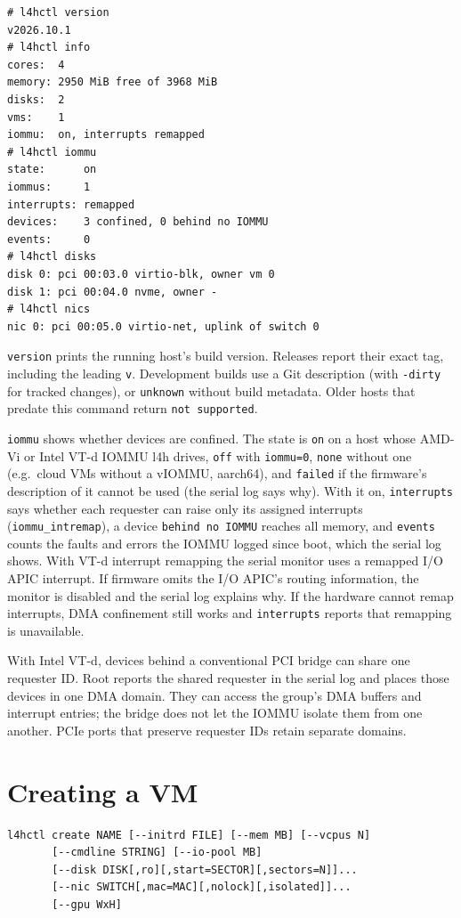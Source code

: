 \documentclass[11pt,a4paper]{report}
\newcommand{\cmd}[1]{\texttt{#1}}
\begin{document}
\begin{lstlisting}
# l4hctl version
v2026.10.1
# l4hctl info
cores:  4
memory: 2950 MiB free of 3968 MiB
disks:  2
vms:    1
iommu:  on, interrupts remapped
# l4hctl iommu
state:      on
iommus:     1
interrupts: remapped
devices:    3 confined, 0 behind no IOMMU
events:     0
# l4hctl disks
disk 0: pci 00:03.0 virtio-blk, owner vm 0
disk 1: pci 00:04.0 nvme, owner -
# l4hctl nics
nic 0: pci 00:05.0 virtio-net, uplink of switch 0
\end{lstlisting}

\cmd{version} prints the running host's build version. Releases report
their exact tag, including the leading \texttt{v}. Development builds use
a Git description (with \texttt{-dirty} for tracked changes), or
\texttt{unknown} without build metadata. Older hosts that predate this
command return \texttt{not supported}.

\cmd{iommu} shows whether devices are confined. The state is \texttt{on}
on a host whose AMD-Vi or Intel VT-d IOMMU l4h drives, \texttt{off} with \texttt{iommu=0},
\texttt{none} without one (e.g.\ cloud VMs without a vIOMMU, aarch64), and
\texttt{failed} if the firmware's description of it cannot be used (the
serial log says why). With it on, \texttt{interrupts} says whether each
requester can raise only its assigned interrupts (\texttt{iommu\_intremap}), a
device \texttt{behind no IOMMU} reaches all memory, and \texttt{events}
counts the faults and errors the IOMMU logged since boot, which the serial
log shows. With VT-d interrupt remapping the serial monitor uses a remapped
I/O APIC interrupt. If firmware omits the I/O APIC's routing information,
the monitor is disabled and the serial log explains why. If the
hardware cannot remap interrupts, DMA confinement still works and
\texttt{interrupts} reports that remapping is unavailable.

With Intel VT-d, devices behind a conventional PCI bridge can share one
requester ID. Root reports the shared requester in the serial log and
places those devices in one DMA domain. They can access the group's DMA
buffers and interrupt entries; the bridge does not let the IOMMU isolate
them from one another. PCIe ports that preserve requester IDs retain
separate domains.

\section{Creating a VM}

\begin{lstlisting}
l4hctl create NAME [--initrd FILE] [--mem MB] [--vcpus N]
       [--cmdline STRING] [--io-pool MB]
       [--disk DISK[,ro][,start=SECTOR][,sectors=N]]...
       [--nic SWITCH[,mac=MAC][,nolock][,isolated]]...
       [--gpu WxH]
\end{lstlisting}
\end{document}

